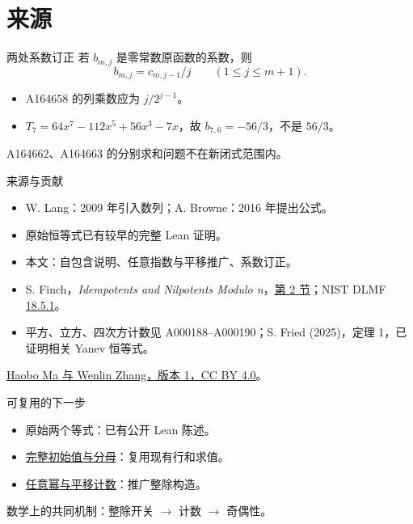 \documentclass{beamer}
\begin{document}
\section{来源}
\begin{frame}{两处系数订正}
若 $b_{m,j}$ 是零常数原函数的系数，则
\[
b_{m,j}=c_{m,j-1}/j\qquad(1\le j\le m+1).
\]
\begin{itemize}
\item A164658 的列乘数应为 $j/2^{j-1}$。
\item $T_7=64x^7-112x^5+56x^3-7x$，故 $b_{7,6}=-56/3$，不是 $56/3$。
\end{itemize}
A164662、A164663 的分别求和问题不在新闭式范围内。
\end{frame}
\begin{frame}{来源与贡献}
\small
\begin{itemize}
\item W. Lang：2009 年引入数列；A. Browne：2016 年提出公式。
\item 原始恒等式已有较早的完整 Lean 证明。
\item 本文：自包含说明、任意指数与平移推广、系数订正。
\item S. Finch，\emph{Idempotents and Nilpotents Modulo n}，\href{https://arxiv.org/abs/math/0605019v2}{第 2 节}；NIST DLMF \href{https://dlmf.nist.gov/18.5.E1}{18.5.1}。
\item 平方、立方、四次方计数见 A000188--A000190；S. Fried (2025)，定理 1，已证明相关 Yanev 恒等式。
\end{itemize}
\href{https://doi.org/10.5281/zenodo.23884883}{Haobo Ma 与 Wenlin Zhang，版本 1，CC BY 4.0}。
\end{frame}
\begin{frame}{可复用的下一步}
\begin{itemize}
\item 原始两个等式：已有公开 Lean 陈述。
\item \href{https://github.com/the-omega-institute/trureturing-requests/issues/234}{完整初始值与分母}：复用现有行和求值。
\item \href{https://github.com/the-omega-institute/trureturing-requests/issues/235}{任意幂与平移计数}：推广整除构造。
\end{itemize}
数学上的共同机制：整除开关 $\longrightarrow$ 计数 $\longrightarrow$ 奇偶性。
\end{frame}
\appendix
\FormalVerification
\end{document}

